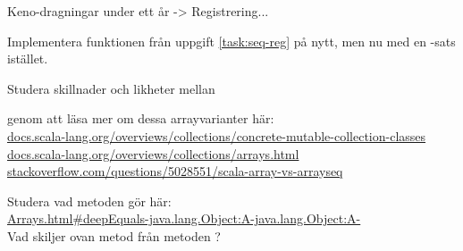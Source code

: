 \Task Keno-dragningar under ett år -> Registrering...

\ExtraTasks %


\Task Implementera funktionen  från uppgift \ref{task:seq-reg} på nytt, men nu med en -sats istället.



\AdvancedTasks %

\Task Studera skillnader och likheter mellan 

\Subtask {}

\Subtask {}  

\Subtask {} 

\noindent genom att läsa mer om dessa arrayvarianter här: \\
\href{http://docs.scala-lang.org/overviews/collections/concrete-mutable-collection-classes}{docs.scala-lang.org/overviews/collections/concrete-mutable-collection-classes} \\  
\href{http://docs.scala-lang.org/overviews/collections/arrays.html}{docs.scala-lang.org/overviews/collections/arrays.html}  \\ 
\href{http://stackoverflow.com/questions/5028551/scala-array-vs-arrayseq}{stackoverflow.com/questions/5028551/scala-array-vs-arrayseq}   
    
    
\Task Studera vad metoden  gör här:\\
\href{https://docs.oracle.com/javase/8/docs/api/java/util/Arrays.html#deepEquals-java.lang.Object:A-java.lang.Object:A-}{Arrays.html\#deepEquals-java.lang.Object:A-java.lang.Object:A-} \\
Vad skiljer ovan metod från metoden ?
    
